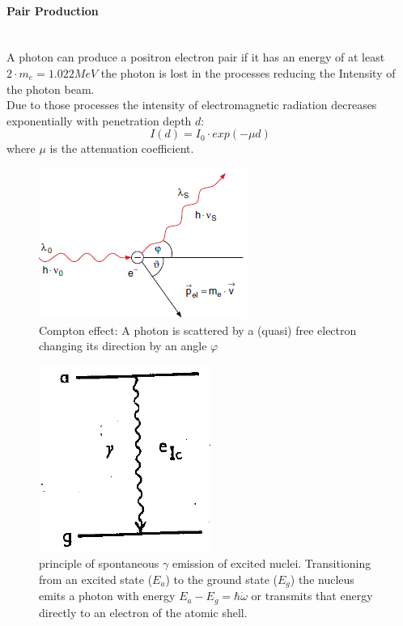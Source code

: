 \paragraph{Pair Production} \ \\
A photon can produce a positron electron pair if it has an energy of at least $2\cdot m_e=1.022MeV$ the photon is lost in the processes reducing the Intensity of the photon beam.\\
Due to those processes the intensity of electromagnetic radiation decreases exponentially with penetration depth $d$:
\begin{equation}
I(d)=I_0 \cdot exp(-\mu d)
\end{equation}
where $\mu$ is the attenuation coefficient.
\begin{figure}[h]
	\centering
	\includegraphics[width=0.5\linewidth]{graphics/Compton}
	\caption{Compton effect: A photon is scattered by a (quasi) free electron changing its direction by an angle $\varphi$\cite{Demtröder} }
	\label{fig:principles:Compton}
\end{figure}

\begin{figure}[H]
	\centering
	\includegraphics[height=0.18\textheight]{graphics/Emission}
	\caption[spontaneous $\gamma$ emission]{principle of spontaneous $\gamma$ emission of excited nuclei. Transitioning from an excited state ($E_a$) to the ground state ($E_g$) the nucleus emits a photon with energy $E_a-E_g=\hbar\dot \omega$ or transmits that energy directly to an electron of the atomic shell.\cite{Wegener}}
	\label{fig:principles:Emission}
\end{figure}
